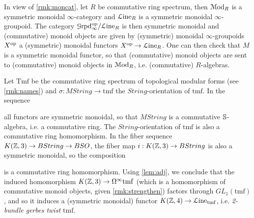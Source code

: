 \documentclass[10pt]{amsart}
\begin{document}
In view of \cref{rmk:moncat}, let $R$ be commutative ring spectrum, then $\mathcal{M}\mathrm{od}_R$ is a symmetric monoidal $\infty$-category and $\mathcal{L}\mathrm{ine}_R$ is a symmetric monoidal $\infty$-groupoid. The category $\mathcal{G}\mathrm{rpd}^{\mathrm{op}}_\infty/\mathcal{L}\mathrm{ine}_R$ is then symmetric monoidal and (commutative) monoid objects are given by (symmetric) monoidal $\infty$-groupoids $X^{\mathrm{op}}$ a (symmetric) monoidal functors $X^{\mathrm{op}}\to\mathcal{L}\mathrm{ine}_R$. One can then check that $M$ is a symmetric monoidal functor, so that (commutative) monoid objects are sent to (commutative) monoid objects in $\mathcal{M}\mathrm{od}_R$, i.e. (commutative) $R$-algebras. 
\begin{example}\label{ex:tmf}
	Let $\mathrm{Tmf}$ be the commutative ring spectrum of topological modular forms (see \cref{rmk:names}) and $\sigma:MString\to\mathrm{tmf}$ the $String$-orientation of $\mathrm{tmf}$. In the sequence \begin{center}
	\end{center}all functors are symmetric monoidal, so that $MString$ is a commutative $\mathbb{S}$-algebra, i.e. a commutative ring. The $String$-orientation of $\mathrm{tmf}$ is also a commutative ring homomorphism. In the fiber sequence $K(\mathbb{Z},3)\to BString\to BSO$, the fiber map $i:K(\mathbb{Z},3)\to BString$ is also a symmetric monoidal, so the composition 
	\begin{center}
	\end{center}is a commutative ring homomorphism. Using \cref{lem:adj}, we conclude that the induced homomorphism $K(\mathbb{Z},3)\to\Omega^\infty\mathrm{tmf}$ (which is a homomorphism of commutative monoid objects, given \cref{rmk:strengthen}) factors through $GL_1(\mathrm{tmf})$, and so it induces a (symmetric monoidal) functor $K(\mathbb{Z},4)\to\mathcal{L}\mathrm{ine}_\mathrm{tmf}$, i.e. \emph{2-bundle gerbes twist $\mathrm{tmf}$}.
\end{example}
\end{document}
